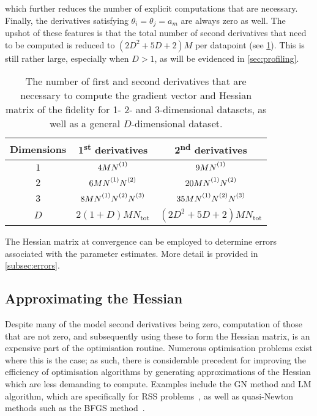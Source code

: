 which further reduces the number of explicit computations that are necessary.
Finally, the derivatives satisfying $\theta_i = \theta_j = a_m$ are always
zero as well. The upshot of these features is that the total number of second
derivatives that need to be computed is reduced to $(2D^2 + 5D + 2)M$ per
datapoint (see \cref{tab:number-of-derivatives}). This is still rather large,
especially when $D>1$, as will be evidenced in \cref{sec:profiling}.
\begin{table}
    \begin{center}
        \begin{tabular}{ c c c }
            \toprule
            Dimensions &
                \raisebox{\depth}{\#} 1\textsuperscript{st} derivatives &
                \raisebox{\depth}{\#} 2\textsuperscript{nd} derivatives\\
            \midrule
            $1$ & $4M\None$ & $9M\None$\\
            $2$ & $6M\None\Ntwo$ & $20M\None\Ntwo$\\
            $3$ & $8M\None\Ntwo\Nthree$ & $35M\None\Ntwo\Nthree$\\
            $D$ &  $2(1 + D)M N_{\text{tot}}$ &  $(2D^2 + 5D + 2) M N_{\text{tot}}$\\
            \bottomrule
        \end{tabular}
    \end{center}
    \caption[
        The number of first and second derivatives that are necessary to
        compute the gradient vector and Hessian matrix of the fidelity for
        \acs{FID} estimation.
    ]{
        The number of first and second derivatives that are necessary to
        compute the gradient vector and Hessian matrix of the fidelity for
        1- 2- and 3-dimensional datasets, as well as a general $D$-dimensional
        dataset.
    }
    \label{tab:number-of-derivatives}
\end{table}

The Hessian matrix at convergence can be employed to determine errors
associated with the parameter estimates. More detail is provided in
\cref{subsec:errors}.

\subsection{Approximating the Hessian}
\label{subsec:hess-approx}
Despite many of the model second derivatives being zero, computation of those
that are not zero, and subsequently using these to form the Hessian matrix,
is an expensive part of the optimisation routine.
Numerous optimisation problems exist where this is the case; as such,
there is considerable precedent for improving the efficiency of optimisation
algorithms by generating approximations of the Hessian which are less demanding
to compute.
Examples include the \ac{GN} method and \ac{LM} algorithm,
which are specifically for \ac{RSS} problems~\cite[Chapter
10]{Nocedal2006}, as well as quasi-Newton methods such as the \ac{BFGS}
method~\cite[Chapter 6]{Nocedal2006}.

